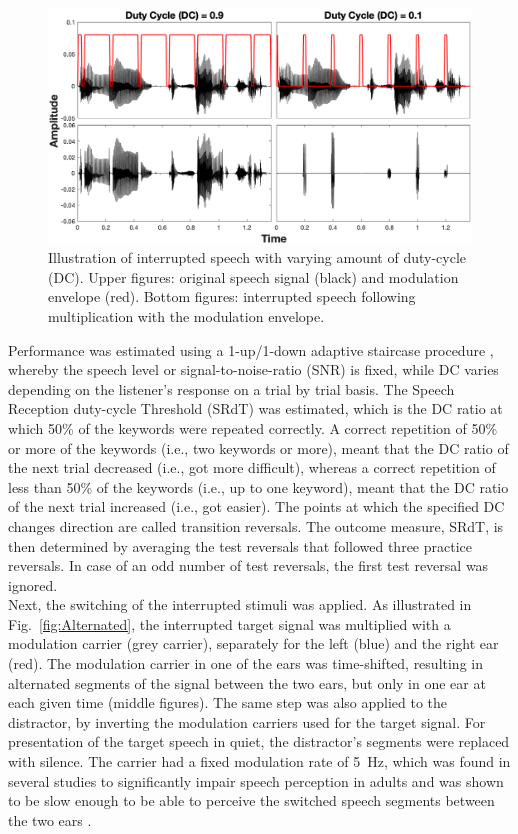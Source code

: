 \documentclass[a4paper, twoside]{templates/ociamthesis}
\begin{document}
\begin{figure}[ht]
\center
\includegraphics[width=\textwidth]{figures/Chapt1/InterruptionsExample_2020.PNG}
\caption{\label{fig:Interrupted}{Illustration of interrupted speech with varying amount of duty-cycle (DC). Upper figures: original speech signal (black) and modulation envelope (red). Bottom figures: interrupted speech following multiplication with the modulation envelope.}}
\end{figure}

Performance was estimated using a 1-up/1-down adaptive staircase procedure \autocite[e.g.,][]{Levitt1971}, whereby the speech level or signal-to-noise-ratio (SNR) is fixed, while DC varies depending on the listener's response on a trial by trial basis. The Speech Reception duty-cycle Threshold (SRdT) was estimated, which is the DC ratio at which 50\% of the keywords were repeated correctly. A correct repetition of 50\% or more of the keywords (i.e., two keywords or more), meant that the DC ratio of the next trial decreased (i.e., got more difficult), whereas a correct repetition of less than 50\% of the keywords (i.e., up to one keyword), meant that the DC ratio of the next trial increased (i.e., got easier). The points at which the specified DC changes direction are called transition reversals. The outcome measure, SRdT, is then determined by averaging the test reversals that followed three practice reversals. In case of an odd number of test reversals, the first test reversal was ignored.\\

Next, the switching of the interrupted stimuli was applied. As illustrated in Fig.~\ref{fig:Alternated}, the interrupted target signal was multiplied with a modulation carrier (grey carrier), separately for the left (blue) and the right ear (red). The modulation carrier in one of the ears was time-shifted, resulting in alternated segments of the signal between the two ears, but only in one ear at each given time (middle figures). The same step was also applied to the distractor, by inverting the modulation carriers used for the target signal. For presentation of the target speech in quiet, the distractor's segments were replaced with silence. The carrier had a fixed modulation rate of 5~Hz, which was found in several studies to significantly impair speech perception in adults and was shown to be slow enough to be able to perceive the switched speech segments between the two ears \autocite{Cherry1954}.\\
\end{document}
